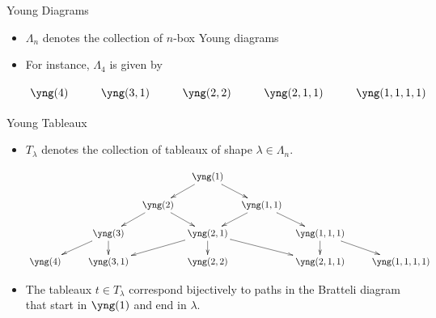 \documentclass[slideColor]{prosper}
\renewcommand{\>}{\rangle}
\newcommand{\<}{\langle}
\begin{document}
\begin{slide}{Young Diagrams}

\begin{itemize}
\item $\Lambda_n$ denotes the collection of $n$-box Young diagrams

\bigskip
\item For instance, $\Lambda_4$ is given by

\begin{tiny}
\[\xymatrix@R=.5cm@C=.3cm{
{\yng(4)} & & {\yng(3,1)} & & {\yng(2,2)} & &  {\yng(2,1,1)} & & {\yng(1,1,1,1)}
}\]
\end{tiny}

\end{itemize}

\end{slide}


\begin{slide}{Young Tableaux}
\vspace{-0.3cm}
\begin{itemize}
\item $T_\lambda$ denotes the collection of tableaux of shape $\lambda\in\Lambda_n$.

\begin{tiny}
\[\xymatrix@R=.5cm@C=.3cm{
& & & & {\yng(1)} \ar[dr] \ar[dl]\\
& & & {\yng(2)} \ar[dl] \ar[dr] & &  {\yng(1,1)}\ar[dl]\ar[dr] \\
& & {\yng(3)}\ar[dll]\ar[d] & & {\yng(2,1)}\ar[dll]\ar[d]\ar[drr] & & {\yng(1,1,1)}\ar[d]\ar[drr] \\
{\yng(4)} & & {\yng(3,1)} & & {\yng(2,2)} & &  {\yng(2,1,1)} & & {\yng(1,1,1,1)}
}\]
\end{tiny}

\vspace{-0.3cm}
\item The tableaux $t\in T_\lambda$ correspond bijectively to paths in the Bratteli diagram that start in {\tiny $\yng(1)$} and end in $\lambda$.
\end{itemize}

\end{slide}

\end{document}
